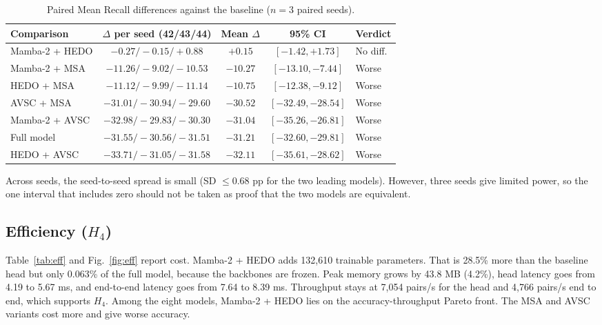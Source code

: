 \documentclass[pdflatex,sn-mathphys-num]{sn-jnl}
\begin{document}
\begin{table}[t]
\centering
\caption{Paired Mean Recall differences against the baseline ($n=3$ paired seeds).}
\label{tab:delta}
\setlength{\tabcolsep}{4pt}
\begin{tabular}{lcccl}
\toprule
Comparison & $\Delta$ per seed (42/43/44) & Mean $\Delta$ & 95\% CI & Verdict\\
\midrule
Mamba-2 + HEDO & $-0.27/-0.15/+0.88$ & $+0.15$ & $[-1.42,+1.73]$ & No diff.\\
Mamba-2 + MSA & $-11.26/-9.02/-10.53$ & $-10.27$ & $[-13.10,-7.44]$ & Worse\\
HEDO + MSA & $-11.12/-9.99/-11.14$ & $-10.75$ & $[-12.38,-9.12]$ & Worse\\
AVSC + MSA & $-31.01/-30.94/-29.60$ & $-30.52$ & $[-32.49,-28.54]$ & Worse\\
Mamba-2 + AVSC & $-32.98/-29.83/-30.30$ & $-31.04$ & $[-35.26,-26.81]$ & Worse\\
Full model & $-31.55/-30.56/-31.51$ & $-31.21$ & $[-32.60,-29.81]$ & Worse\\
HEDO + AVSC & $-33.71/-31.05/-31.58$ & $-32.11$ & $[-35.61,-28.62]$ & Worse\\
\bottomrule
\end{tabular}
\end{table}



Across seeds, the seed-to-seed spread is small (SD $\le0.68$ pp for the two leading models). However, three seeds give limited power, so the one interval that includes zero should not be taken as proof that the two models are equivalent.

\subsection{Efficiency ($H_4$)}
Table~\ref{tab:eff} and Fig.~\ref{fig:eff} report cost. Mamba-2 + HEDO adds 132,610 trainable parameters. That is 28.5\% more than the baseline head but only 0.063\% of the full model, because the backbones are frozen. Peak memory grows by 43.8 MB (4.2\%), head latency goes from 4.19 to 5.67 ms, and end-to-end latency goes from 7.64 to 8.39 ms. Throughput stays at 7,054 pairs/s for the head and 4,766 pairs/s end to end, which supports $H_4$. Among the eight models, Mamba-2 + HEDO lies on the accuracy-throughput Pareto front. The MSA and AVSC variants cost more and give worse accuracy.
\end{document}
